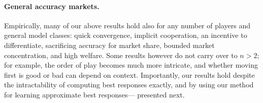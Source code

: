 \paragraph{General accuracy markets.}
Empirically, many of our above results hold also for any number of players
and general model classes:
quick convergence, implicit cooperation,
an incentive to differentiate, sacrificing accuracy for market share,
bounded market concentration, and high welfare.
Some results however do not carry over to $n>2$;
for example, the order of play becomes much more intricate,
and whether moving first is good or bad can depend on context.
Importantly, our results hold despite the intractability of computing best responses exactly,
and by using our method for learning approximate best responses---%
presented next.











